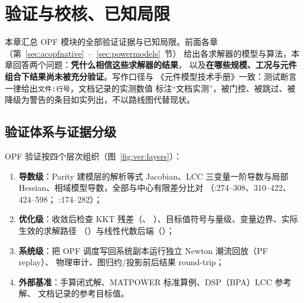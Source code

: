 \section{验证与校核、已知局限}\label{sec:verification}

本章汇总 OPF 模块的全部验证证据与已知局限。前面各章（第~\ref{sec:acopfnative}~--~\ref{sec:powermodels}~节）
给出各求解器的模型与算法，本章回答两个问题：\textbf{凭什么相信这些求解器的结果}，
以及\textbf{在哪些规模、工况与元件组合下结果尚未被充分验证}。写作口径与
《元件模型技术手册》一致：测试断言一律给出\texttt{文件:行号}，文档记录的实测数值
标注“文档实测”，被门控、被跳过、被降级为警告的条目如实列出，不以路线图代替现状。

\subsection{验证体系与证据分级}\label{subsec:ver:layers}

OPF 验证按四个层次组织（图~\ref{fig:ver:layers}）：

\begin{enumerate}
  \item \textbf{导数级}：Parity 建模层的解析等式 Jacobian、LCC 三变量一阶导数与局部
        Hessian、相域模型导数，全部与中心有限差分比对
        （:274--308、310--422、424--598；
        :174--282）；
  \item \textbf{优化级}：收敛后检查 KKT 残差（、
        ）、目标值符号与量级、变量边界、实际生效的求解路径
        （）与线性代数后端（）；
  \item \textbf{系统级}：把 OPF 调度写回系统副本运行独立 Newton 潮流回放（PF replay）、
         物理审计、图归约/投影前后结果 round-trip；
  \item \textbf{外部基准}：手算闭式解、MATPOWER 标准算例、DSP（BPA）LCC 参考解、
        文档记录的参考目标值。
\end{enumerate}


